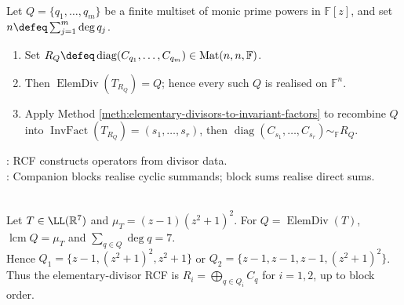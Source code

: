 \begin{method} \label{meth:construct-operator-from-elementary-divisors} \\
Let $Q=\{q_1,\ldots,q_m\}$ be a finite multiset of monic prime powers in $\mathbb{F}[z]$, and set $n\defeq\sum_{j=1}^m\deg q_j$.
\begin{enumerate}[label=(\roman*)]
\setlength{\itemsep}{0pt}
\item Set $R_Q\defeq\operatorname{diag}(C_{q_1},\ldots,C_{q_m})\in\operatorname{Mat}(n,n,\mathbb{F})$.
\item Then $\operatorname{ElemDiv}(T_{R_Q})=Q$; hence every such $Q$ is realised on $\mathbb{F}^n$.
\item Apply Method \ref{meth:elementary-divisors-to-invariant-factors} to recombine $Q$ into $\operatorname{InvFact}(T_{R_Q})=(s_1,\ldots,s_r)$, then $\operatorname{diag}(C_{s_1},\ldots,C_{s_r})\sim_{\mathbb{F}}R_Q$.
\end{enumerate}
: RCF constructs operators from divisor data.\\
: Companion blocks realise cyclic summands; block sums realise direct sums.
\end{method}

\begin{example} \label{ex:rational-canonical-forms-from-minimal-polynomial} \\
Let $T\in\LL(\mathbb{R}^7)$ and $\mu_T=(z-1)(z^2+1)^2$. For $Q=\operatorname{ElemDiv}(T)$, $\operatorname{lcm}Q=\mu_T$ and $\sum_{q\in Q}\deg q=7$.\\
Hence $Q_1=\{z-1,(z^2+1)^2,z^2+1\}$ or $Q_2=\{z-1,z-1,z-1,(z^2+1)^2\}$.\\
Thus the elementary-divisor RCF is $R_i=\bigoplus_{q\in Q_i}C_q$ for $i=1,2$, up to block order.
\end{example}

